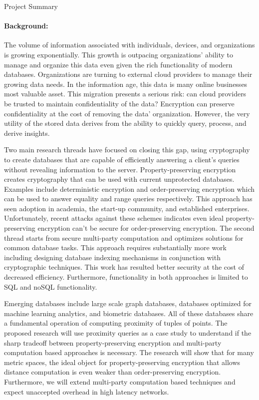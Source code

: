 \documentclass[11pt]{article}
\begin{document}
\begin{centering}
\LARGE
Project Summary
\hline
\end{centering}

\paragraph{Background:}  

The volume of information associated with individuals, devices, and organizations is growing exponentially.  This growth is outpacing organizations' ability to manage and organize this data even given the rich functionality of modern databases. Organizations are turning to external cloud providers to manage their growing data needs.  In the information age, this data is many online businesses most valuable asset.  This migration presents a serious risk: can cloud providers be trusted to maintain confidentiality of the data?  Encryption can preserve confidentiality at the cost of removing the data' organization.  However, the very utility of the stored data derives from the ability to quickly query, process, and derive insights.

Two main research threads have focused on closing this gap, using cryptography to create databases that are capable of efficiently answering a client's queries without revealing information to the server.  
Property-preserving encryption creates cryptography that can be used with current unprotected databases. Examples include deterministic encryption and order-preserving encryption which can be used to answer equality and range queries respectively.  This approach has seen adoption in academia, the start-up community, and established enterprises.  Unfortunately, recent attacks against these schemes indicates even ideal property-preserving encryption can't be secure for order-preserving encryption.  The second thread starts from secure multi-party computation and optimizes solutions for common database tasks.  This approach requires substantially more work including designing database indexing mechanisms in conjunction with cryptographic techniques.  This work has resulted better security at the cost of decreased efficiency.  Furthermore, functionality in both approaches is limited to SQL and noSQL functionality.

Emerging databases include large scale graph databases, databases optimized for machine learning analytics, and biometric databases.  All of these databases share a fundamental operation of computing proximity of tuples of points.  The proposed research will use proximity queries as a case study to understand if the sharp tradeoff between property-preserving encryption and multi-party computation based approaches is necessary.  The research will show that for many metric spaces, the ideal object for property-preserving encryption that allows distance computation is even weaker than order-preserving encryption.  Furthermore, we will extend multi-party computation based techniques and expect unaccepted overhead in high latency networks.
\end{document}
